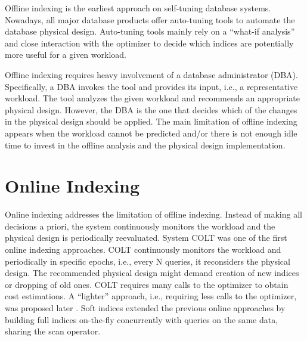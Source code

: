 Offline indexing is the earliest approach on self-tuning database systems.
Nowadays, all major database products offer auto-tuning tools \cite{DBLP:conf/vldb/AgrawalCKMNS04,DBLP:conf/vldb/DagevilleDDYZZ04, DBLP:conf/vldb/ZilioRLLSGF04} to automate the database physical design.
Auto-tuning tools mainly rely on a ``what-if analysis'' \cite{DBLP:conf/sigmod/ChaudhuriN98} and close interaction with the optimizer \cite{DBLP:conf/vldb/ChaudhuriN97} to decide which indices are potentially more useful for a given workload.

Offline indexing  requires heavy involvement of a database administrator (DBA).
Specifically, a DBA invokes the tool and provides its input, i.e., a representative workload.
The tool analyzes the given workload and recommends an appropriate physical design.
However, the DBA is the one that decides which of the changes in the physical design should be applied.
The main limitation of offline indexing appears when the workload cannot be predicted and/or there is not enough idle time to invest in the offline analysis and the physical design implementation. 



\section{Online Indexing}
\label{sec:online}

Online indexing addresses the limitation of offline indexing.
Instead of making all decisions a priori, the system continuously monitors the workload and the physical design is periodically reevaluated.
System COLT \cite{DBLP:conf/sigmod/SchnaitterAMP06} was one of the first online indexing approaches.
COLT continuously monitors the workload and periodically in specific epochs, i.e., every N queries, it reconsiders the physical design.
The recommended physical design might demand creation of new indices or dropping of old ones.
COLT requires many calls to the optimizer to obtain cost estimations.
A ``lighter'' approach, i.e., requiring less calls to the optimizer, was proposed later \cite{DBLP:conf/icde/BrunoC07}.
Soft indices \cite{DBLP:conf/icde/LuhringSSS07} extended the previous 
online approaches by building full indices on-the-fly concurrently with queries on the same data, sharing the scan operator.

